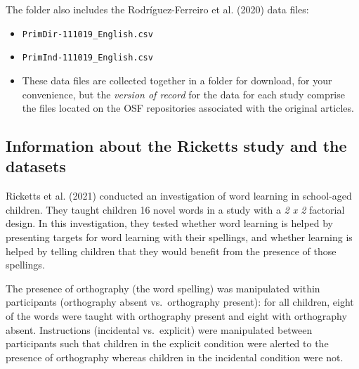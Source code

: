 \documentclass[
  letterpaper,
  DIV=11,
  numbers=noendperiod]{scrreprt}
\providecommand{\tightlist}{%
  \setlength{\itemsep}{0pt}\setlength{\parskip}{0pt}}\usepackage{longtable,booktabs,array}
\begin{document}
The folder also includes the Rodríguez-Ferreiro et al. (2020) data
files:

\begin{itemize}
\tightlist
\item
  \texttt{PrimDir-111019\_English.csv}
\item
  \texttt{PrimInd-111019\_English.csv}
\end{itemize}

\begin{tcolorbox}[enhanced jigsaw, opacitybacktitle=0.6, title=\textcolor{quarto-callout-warning-color}{\faExclamationTriangle}\hspace{0.5em}{Warning}, arc=.35mm, colbacktitle=quarto-callout-warning-color!10!white, colframe=quarto-callout-warning-color-frame, leftrule=.75mm, opacityback=0, breakable, titlerule=0mm, left=2mm, bottomrule=.15mm, toprule=.15mm, colback=white, coltitle=black, bottomtitle=1mm, toptitle=1mm, rightrule=.15mm]

\begin{itemize}
\tightlist
\item
  These data files are collected together in a folder for download, for
  your convenience, but the \emph{version of record} for the data for
  each study comprise the files located on the OSF repositories
  associated with the original articles.
\end{itemize}

\end{tcolorbox}

\hypertarget{sec-ricketts-study}{%
\subsection{Information about the Ricketts study and the
datasets}\label{sec-ricketts-study}}

Ricketts et al. (2021) conducted an investigation of word learning in
school-aged children. They taught children 16 novel words in a study
with a \emph{2 x 2} factorial design. In this investigation, they tested
whether word learning is helped by presenting targets for word learning
with their spellings, and whether learning is helped by telling children
that they would benefit from the presence of those spellings.

The presence of orthography (the word spelling) was manipulated within
participants (orthography absent vs.~orthography present): for all
children, eight of the words were taught with orthography present and
eight with orthography absent. Instructions (incidental vs.~explicit)
were manipulated between participants such that children in the explicit
condition were alerted to the presence of orthography whereas children
in the incidental condition were not.
\end{document}
